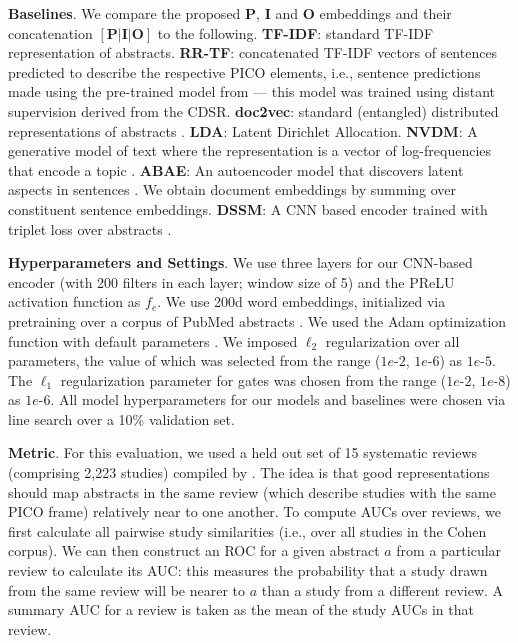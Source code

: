 \documentclass[11pt,a4paper]{article}
\begin{document}
\noindent \textbf{Baselines}. We compare the proposed {\bf P}, {\bf I} and {\bf O} embeddings and their concatenation $\mathbf{[P|I|O]}$ to the following. {\bf TF-IDF}: standard TF-IDF representation of abstracts. {\bf RR-TF}: concatenated TF-IDF vectors of sentences predicted to describe the respective PICO elements, i.e., sentence predictions made using the pre-trained model from \cite{wallace2016extracting} --- this model was trained using distant supervision derived from the CDSR. {\bf doc2vec}: standard (entangled) distributed representations of abstracts \cite{le2014distributed}. {\bf LDA}: Latent Dirichlet Allocation. {\bf NVDM}: A generative model of text where the representation is a vector of log-frequencies that encode a topic \cite{miao2016neural}. {\bf ABAE}: An autoencoder model that discovers latent aspects in sentences \cite{he-2017}. We obtain document embeddings by summing over constituent sentence embeddings. {\bf DSSM}: A CNN based encoder trained with triplet loss over abstracts \cite{shen2014latent}.

\vspace{.15em}
\noindent \textbf{Hyperparameters and Settings}. We use three layers for our CNN-based encoder (with 200 filters in each layer; window size of 5) and the PReLU activation function \cite{he2015delving} as $f_e$. We use 200d word embeddings, initialized via pretraining over a corpus of PubMed abstracts \cite{moen2013distributional}. We used the Adam optimization function with default parameters \cite{kingma2014adam}. We imposed $\ell_2$ regularization over all parameters, the value of which was selected from the range ($1e$-$2$, $1e$-$6$) as $1e$-$5$. The $\ell_1$ regularization parameter for gates was chosen from the range ($1e$-$2$, $1e$-$8$) as $1e$-$6$. All model hyperparameters for our models and baselines were chosen via line search over a 10\% validation set.

\vspace{.15em}
\noindent \textbf{Metric}. For this evaluation, we used a held out set of 15 systematic reviews (comprising 2,223 studies) compiled by . The idea is that good representations should map abstracts in the same review (which describe studies with the same PICO frame) relatively near to one another. To compute AUCs over reviews, we first calculate all pairwise study similarities (i.e., over all studies in the Cohen corpus). We can then construct an ROC for a given abstract $a$ from a particular review to calculate its AUC: this measures the probability that a study drawn from the same review will be nearer to $a$ than a study from a different review. A summary AUC for a review is taken as the mean of the study AUCs in that review.
\end{document}
